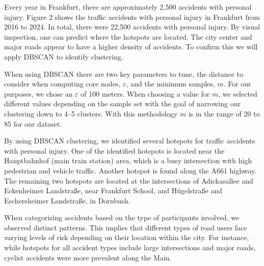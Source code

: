 \documentclass[10pt,a4paper]{article} %
\begin{document}
Every year in Frankfurt, there are approximately 2,500 accidents with personal injury. Figure 2 shows the traffic accidents with personal injury in Frankfurt from 2016 to 2024. In total, there were 22,500 accidents with personal injury. By visual inspection, one can predict where the hotspots are located. The city center and major roads appear to have a higher density of accidents. To confirm this we will apply DBSCAN to identify clustering.
\medskip\par
When using DBSCAN there are two key parameters to tune, the distance to consider when computing core nodes, \(\varepsilon{}\), and the minimum samples, \(m\). For our purposes, we chose an \(\varepsilon{}\) of 100 meters. When choosing a value for \(m\), we selected different values depending on the sample set with the goal of narrowing our clustering down to 4--5 clusters. With this methodology \(m\) is in the range of 20 to 85 for our dataset.
\medskip\par
By using DBSCAN clustering, we identified several hotspots for traffic accidents with personal injury. One of the identified hotspots is located near the Hauptbahnhof (main train station) area, which is a busy intersection with high pedestrian and vehicle traffic. Another hotspot is found along the A661 highway. The remaining two hotspots are located at the intersections of Adickasallee and Eckenheimer Landstraße, near Frankfurt School, and Hügelstraße and Eschersheimer Landstraße, in Dornbush.
\medskip\par
When categorizing accidents based on the type of participants involved, we observed distinct patterns. This implies that different types of road users face varying levels of risk depending on their location within the city. For instance, while hotspots for all accident types include large intersections and major roads, cyclist accidents were more prevalent along the Main.
\end{document}
